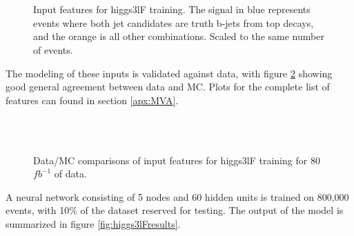 \begin{figure}[h!]
    \\
    \\
    \caption{Input features for higgs3lF training. The signal in blue represents events where both jet candidates are truth b-jets from top decays, and the orange is all other combinations. Scaled to the same number of events.}
    \label{fig:features_higgs3lF}
\end{figure}

The modeling of these inputs is validated against data, with figure \ref{fig:model_higgs3lF} showing good general agreement between data and MC. Plots for the complete list of features can found in section \ref{apx:MVA}.

\begin{figure}[h!]
    \\
    \\
    \caption{Data/MC comparisons of input features for higgs3lF training for 80 $fb^{-1}$ of data.}
    \label{fig:model_higgs3lF}
\end{figure} 

A neural network consisting of 5 nodes and 60 hidden units is trained on 800,000 events, with 10\% of the dataset reserved for testing. The output of the model is summarized in figure \ref{fig:higgs3lFresults}.

